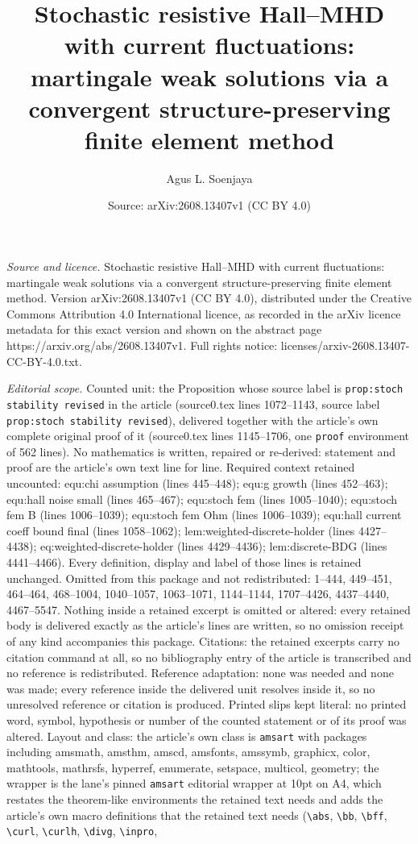 \documentclass[10pt,a4paper]{amsart}
\title[Stochastic resistive Hall--MHD with current fluctuations: ma]{Stochastic resistive Hall--MHD with current fluctuations: martingale weak solutions via a convergent structure-preserving finite element method}
\author{Agus L. Soenjaya}
\date{Source: arXiv:2608.13407v1 (CC BY 4.0)}
\begin{document}
\maketitle

\noindent\emph{Source and licence.} Stochastic resistive Hall--MHD with current fluctuations: martingale weak solutions via a convergent structure-preserving finite element method. Version arXiv:2608.13407v1 (CC BY 4.0), distributed under the Creative Commons Attribution 4.0 International licence, as recorded in the arXiv licence metadata for this exact version and shown on the abstract page https://arxiv.org/abs/2608.13407v1. Full rights notice: licenses/arxiv-2608.13407-CC-BY-4.0.txt.\par\smallskip

\noindent\textit{Editorial scope.} Counted unit: the Proposition whose source label is \texttt{prop:stoch stability revised} in the article (source0.tex lines 1072--1143, source label \texttt{prop:stoch stability revised}), delivered together with the article's own complete original proof of it (source0.tex lines 1145--1706, one \texttt{proof} environment of 562 lines). No mathematics is written, repaired or re-derived: statement and proof are the article's own text line for line. Required context retained uncounted: equ:chi assumption (lines 445--448); equ:g growth (lines 452--463); equ:hall noise small (lines 465--467); equ:stoch fem (lines 1005--1040); equ:stoch fem B (lines 1006--1039); equ:stoch fem Ohm (lines 1006--1039); equ:hall current coeff bound final (lines 1058--1062); lem:weighted-discrete-holder (lines 4427--4438); eq:weighted-discrete-holder (lines 4429--4436); lem:discrete-BDG (lines 4441--4466). Every definition, display and label of those lines is retained unchanged. Omitted from this package and not redistributed: 1--444, 449--451, 464--464, 468--1004, 1040--1057, 1063--1071, 1144--1144, 1707--4426, 4437--4440, 4467--5547. Nothing inside a retained excerpt is omitted or altered: every retained body is delivered exactly as the article's lines are written, so no omission receipt of any kind accompanies this package. Citations: the retained excerpts carry no citation command at all, so no bibliography entry of the article is transcribed and no reference is redistributed. Reference adaptation: none was needed and none was made; every reference inside the delivered unit resolves inside it, so no unresolved reference or citation is produced. Printed slips kept literal: no printed word, symbol, hypothesis or number of the counted statement or of its proof was altered. Layout and class: the article's own class is \texttt{amsart} with packages including amsmath, amsthm, amscd, amsfonts, amssymb, graphicx, color, mathtools, mathrsfs, hyperref, enumerate, setspace, multicol, geometry; the wrapper is the lane's pinned \texttt{amsart} editorial wrapper at 10pt on A4, which restates the theorem-like environments the retained text needs and adds the article's own macro definitions that the retained text needs (\texttt{\textbackslash abs}, \texttt{\textbackslash bb}, \texttt{\textbackslash bff}, \texttt{\textbackslash curl}, \texttt{\textbackslash curlh}, \texttt{\textbackslash divg}, \texttt{\textbackslash inpro}, 
\end{document}
